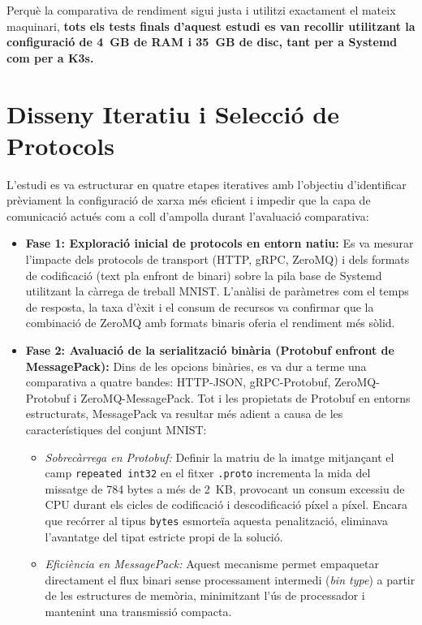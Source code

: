 Perquè la comparativa de rendiment sigui justa i utilitzi exactament el mateix maquinari, \textbf{tots els tests finals d'aquest estudi es van recollir utilitzant la configuració de 4~GB de RAM i 35~GB de disc, tant per a Systemd com per a K3s.}

\section{Disseny Iteratiu i Selecció de Protocols}
L'estudi es va estructurar en quatre etapes iteratives amb l'objectiu d'identificar prèviament la configuració de xarxa més eficient i impedir que la capa de comunicació actués com a coll d'ampolla durant l'avaluació comparativa:

\begin{itemize}
    \item \textbf{Fase 1: Exploració inicial de protocols en entorn natiu:} Es va mesurar l'impacte dels protocols de transport (HTTP, gRPC, ZeroMQ) i dels formats de codificació (text pla enfront de binari) sobre la pila base de Systemd utilitzant la càrrega de treball MNIST. L'anàlisi de paràmetres com el temps de resposta, la taxa d'èxit i el consum de recursos va confirmar que la combinació de ZeroMQ amb formats binaris oferia el rendiment més sòlid.
    \item \textbf{Fase 2: Avaluació de la serialització binària (Protobuf enfront de MessagePack):} Dins de les opcions binàries, es va dur a terme una comparativa a quatre bandes: HTTP-JSON, gRPC-Protobuf, ZeroMQ-Protobuf i ZeroMQ-MessagePack. Tot i les propietats de Protobuf en entorns estructurats, MessagePack va resultar més adient a causa de les característiques del conjunt MNIST:
    \begin{itemize}
        \item \textit{Sobrecàrrega en Protobuf:} Definir la matriu de la imatge mitjançant el camp \texttt{repeated int32} en el fitxer \texttt{.proto} incrementa la mida del missatge de 784 bytes a més de 2~KB, provocant un consum excessiu de CPU durant els cicles de codificació i descodificació píxel a píxel. Encara que recórrer al tipus \texttt{bytes} esmorteïa aquesta penalització, eliminava l'avantatge del tipat estricte propi de la solució.
        \item \textit{Eficiència en MessagePack:} Aquest mecanisme permet empaquetar directament el flux binari sense processament intermedi (\textit{bin type}) a partir de les estructures de memòria, minimitzant l'ús de processador i mantenint una transmissió compacta.

\end{itemize}
\end{itemize}
